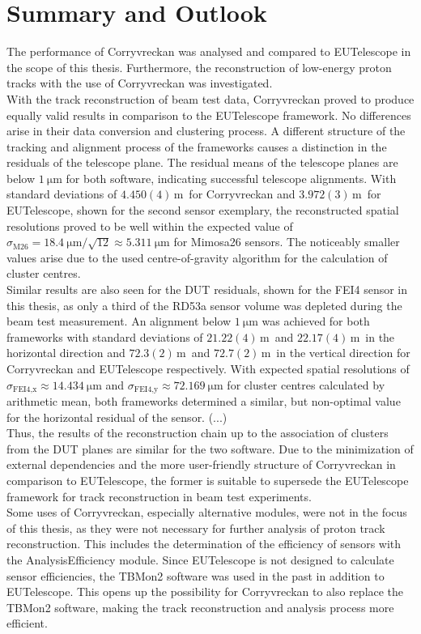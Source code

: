 \chapter{Summary and Outlook}
The performance of Corryvreckan was analysed and compared to EUTelescope in the scope of this thesis. Furthermore, the reconstruction of low-energy proton
tracks with the use of Corryvreckan was investigated.\\
With the track reconstruction of beam test data, Corryvreckan proved to produce equally valid results in comparison to the EUTelescope framework. No differences
arise in their data conversion and clustering process. A different structure of the tracking and alignment process of the frameworks causes a distinction in the residuals
of the telescope plane. The residual means of the telescope planes are below $\SI{1}{\micro\meter}$ for both software, indicating successful telescope alignments.
With standard deviations of $4.450(4)$\,\textmu m\, for Corryvreckan and $3.972(3)$\,\textmu m\, for EUTelescope, shown for the second sensor exemplary, the
reconstructed spatial resolutions proved to be well within
the expected value of $\sigma_{\text{M26}} = \SI{18.4}{\micro\meter}/\sqrt{12} \approx \SI{5.311}{\micro\meter}$ for Mimosa26 sensors. The noticeably smaller values
arise due to the used centre-of-gravity algorithm for the calculation of cluster centres. \\
Similar results are also seen for the DUT residuals, shown for the FEI4 sensor in this thesis, as only a third of the RD53a sensor volume was depleted during the beam test measurement.
An alignment below $\SI{1}{\micro\meter}$ was achieved for both frameworks with standard deviations of $21.22(4)$\,\textmu m\, and $22.17(4)$\,\textmu m\, in the horizontal direction and
$72.3(2)$\,\textmu m\, and $72.7(2)$\,\textmu m\, in the vertical direction for Corryvreckan and EUTelescope respectively. With expected spatial resolutions of
$\sigma_{\text{FEI4},\text{x}} \approx \SI{14.434}{\micro\meter}$ and $\sigma_{\text{FEI4},\text{y}} \approx \SI{72.169}{\micro\meter}$ for cluster centres calculated by
arithmetic mean, both frameworks determined a similar, but non-optimal value for the horizontal residual of the sensor. (...) \\
Thus, the results of the reconstruction chain up to the
association of clusters from the DUT planes are similar for the two software. Due to the minimization of external dependencies and the more user-friendly structure of
Corryvreckan in comparison to EUTelescope, the former is suitable to supersede the EUTelescope framework for track reconstruction in beam test experiments. \\
Some uses of Corryvreckan, especially alternative modules, were not in the focus of this thesis,
as they were not necessary for further analysis of proton track reconstruction. This includes the determination of the
efficiency of sensors with the AnalysisEfficiency module. Since EUTelescope is not designed to calculate sensor efficiencies, the TBMon2 software was used in the past in addition
to EUTelescope. This opens up the possibility for Corryvreckan to also replace the TBMon2 software, making the track reconstruction and analysis process more efficient.

